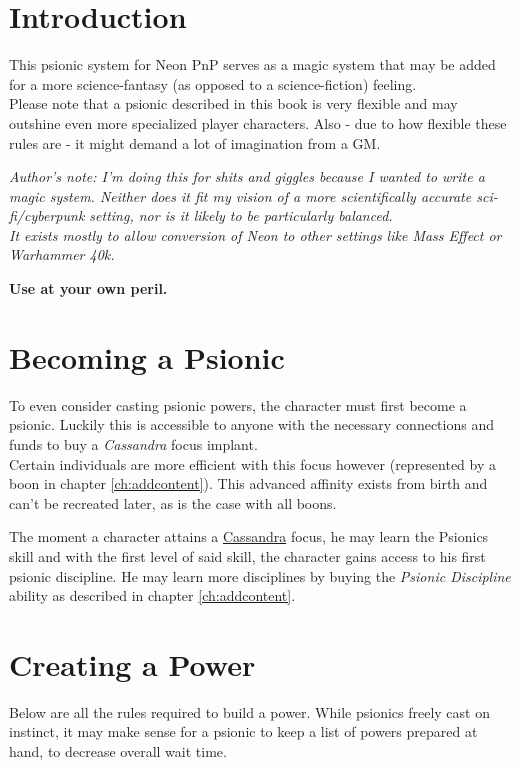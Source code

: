 \documentclass[12pt,a4paper,openany,usenames,dvipsnames]{book}
\begin{document}
	

	\chapter{Introduction}
	This psionic system for Neon PnP serves as a magic system that may be added for a more science-fantasy (as opposed to a science-fiction) feeling.\\
	Please note that a psionic described in this book is very flexible and may outshine even more specialized player characters. Also - due to how flexible these rules are - it might demand a lot of imagination from a GM.

	\begin{exampleblock}
		\itshape
		Author's note: I'm doing this for shits and giggles because I wanted to write a magic system.
		Neither does it fit my vision of a more scientifically accurate sci-fi/cyberpunk setting, nor is it likely to be particularly balanced.\\
		It exists mostly to allow conversion of Neon to other settings like Mass Effect or Warhammer 40k.
		\par
		\textbf{Use at your own peril.}
	\end{exampleblock}

	\chapter{Becoming a Psionic}
	To even consider casting psionic powers, the character must first become a psionic. Luckily this is accessible to anyone with the necessary connections and funds to buy a \emph{Cassandra} focus implant.\\
	Certain individuals are more efficient with this focus however (represented by a boon in chapter \ref{ch:addcontent}). This advanced affinity exists from birth and can't be recreated later, as is the case with all boons. \par
	The moment a character attains a \hyperref[implant:cassandrapsi-focus]{Cassandra} focus,
	he may learn the Psionics skill and with the first level of said skill,
	the character gains access to his first psionic discipline.
	He may learn more disciplines by buying the \emph{Psionic Discipline} ability as described in chapter \ref{ch:addcontent}.

	\chapter{Creating a Power}
	\label{ch:create}
	Below are all the rules required to build a power.
	While psionics freely cast on instinct, it may make sense for a psionic to keep a list of powers prepared at hand, to decrease overall wait time.
\end{document}
